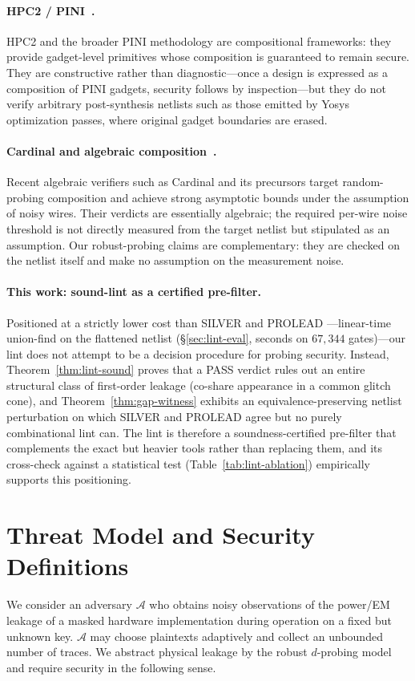\documentclass[lettersize,journal]{IEEEtran}
\newcommand{\Adv}{\mathcal{A}}
\begin{document}
\paragraph{HPC2 / PINI~\cite{cassiers2020hpc,cassiers2021tight}.}
HPC2 and the broader PINI methodology are compositional
frameworks: they provide gadget-level primitives whose composition
is guaranteed to remain secure. They are constructive rather than
diagnostic---once a design is expressed as a composition of PINI
gadgets, security follows by inspection---but they do not verify
arbitrary post-synthesis netlists such as those emitted by Yosys
optimization passes, where original gadget boundaries are erased.

\paragraph{Cardinal and algebraic
composition~\cite{belaid2025cardinal,jahandideh2024algebraic}.}
Recent algebraic verifiers such as Cardinal and its precursors
target random-probing composition and achieve strong asymptotic
bounds under the assumption of noisy wires. Their verdicts are
essentially algebraic; the required per-wire noise threshold is
not directly measured from the target netlist but stipulated as an
assumption. Our robust-probing claims are
complementary: they are checked on the netlist itself and make no
assumption on the measurement noise.

\paragraph{This work: sound-lint as a certified pre-filter.}
Positioned at a strictly lower cost than SILVER and PROLEAD
---linear-time union-find on the flattened netlist
(\S\ref{sec:lint-eval}, seconds on $67{,}344$ gates)---our lint
does not attempt to be a decision procedure for probing security.
Instead, Theorem~\ref{thm:lint-sound} proves that a PASS verdict
rules out an entire structural class of first-order leakage
(co-share appearance in a common glitch cone), and
Theorem~\ref{thm:gap-witness} exhibits an equivalence-preserving
netlist perturbation on which SILVER and PROLEAD agree but no
purely combinational lint can. The lint is therefore a
soundness-certified pre-filter that complements the exact but
heavier tools rather than replacing them, and its cross-check against a
statistical test (Table~\ref{tab:lint-ablation}) empirically supports this
positioning.

\section{Threat Model and Security Definitions}
\label{sec:model}
We consider an adversary $\Adv$ who obtains noisy observations of the power/EM
leakage of a masked hardware implementation during operation on a fixed but
unknown key. $\Adv$ may choose plaintexts adaptively and collect an
unbounded number of traces. We abstract physical leakage by the robust
$d$-probing model and require security in the following sense.
\end{document}
